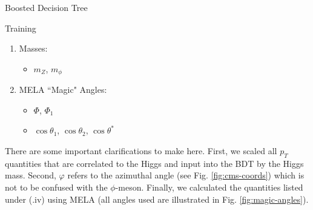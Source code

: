 \begin{section}{Boosted Decision Tree}
\begin{subsection}{Training}
\begin{enumerate}[(i.)]
\begin{itemize}
    \end{itemize}
    \item Masses:
    \begin{itemize}
        \item $m_{Z}$, $m_{\phi}$
    \end{itemize}
    \item MELA ``Magic" Angles:
    \begin{itemize}
        \item $\Phi$, $\Phi_{1}$
        \item $\cos\theta_{1}$, $\cos\theta_{2}$, $\cos\theta^{*}$
    \end{itemize}
\end{enumerate}

\noindent There are some important clarifications to make here. First, we scaled all $p_{T}$ quantities that are correlated to the Higgs and input into the BDT by the Higgs mass. Second, $\varphi$ refers to the azimuthal angle (see Fig. \ref{fig:cms-coords}) which is not to be confused with the $\phi$-meson. Finally, we calculated the quantities listed under (.iv) using MELA\cite{cite-mela} (all angles used are illustrated in Fig. \ref{fig:magic-angles}).


\end{subsection}
\end{section}
